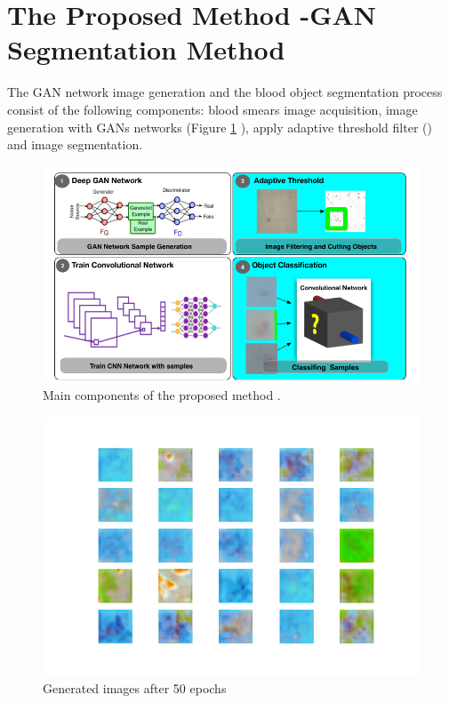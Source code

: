 \section{The Proposed Method -GAN Segmentation Method}
\label{segmethod}


The GAN network image generation and the blood object segmentation process consist of the following components: blood smears image acquisition, image generation with GANs networks (Figure \ref{fig:maincomp} ),  apply adaptive  threshold filter () and image segmentation.



\begin{figure}[h]
\label{fig:maincomp}
  \includegraphics[width=\textwidth]{images/MainComponents.png}
  \caption{Main components of the proposed method .}
\end{figure}



\begin{figure}[h]
\label{fig:gen50}
\begin{center}
\includegraphics[scale=0.45]{./images/generation/alta_mnist_50.png} \end{center}
\caption{Generated images after 50 epochs}
\end{figure}


